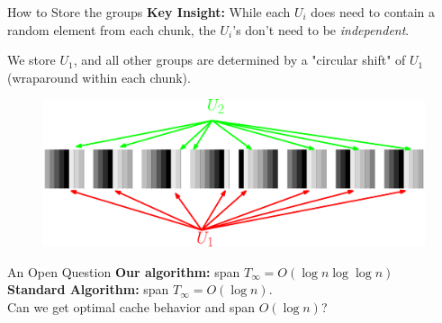 \documentclass[xcolor=x11names, svgnames, rgb]{beamer}
\newcommand{\polylog}{\operatorname{polylog}}
\begin{document}
\begin{frame}[t]{How to Store the groups}
	\textbf{Key Insight:} While each $U_i$ does need to contain a random element from each chunk, the $U_i$'s don't need to be \emph{independent}.

	\vspace{0.5cm}
	We store $U_1$, and all other groups are determined by a "circular shift" of $U_1$ (wraparound within each chunk).
	\vspace{0.5cm}
	\begin{figure}
		\includegraphics[width=\linewidth]{imgs/blackrainbowAlt.eps}
	\end{figure}	
\end{frame}



\begin{frame}[t]{An Open Question}
	\vspace{0.5cm}
	\textbf{Our algorithm:} span $T_\infty = O(\log n \log\log n)$\\
	\vspace{0.5cm}
	\textbf{Standard Algorithm:} span $T_\infty = O(\log n)$.\\
	\vspace{1cm}
	Can we get optimal cache behavior and span $O(\log n)$?
\end{frame}
\end{document}
